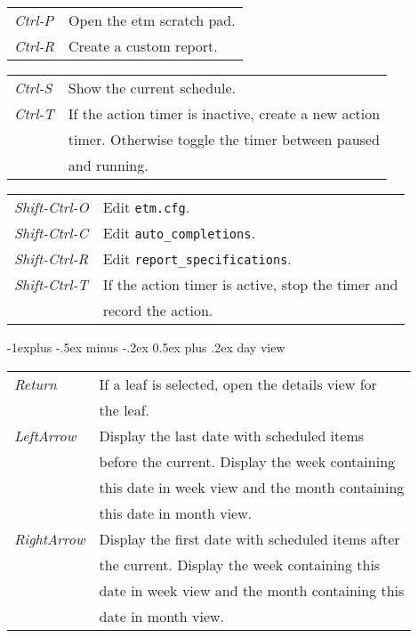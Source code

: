 \documentclass[9pt,landscape]{article}
\makeatletter
\renewcommand{\subsection}{\@startsection{subsection}{2}{0mm}%
                                {-1explus -.5ex minus -.2ex}%
                                {0.5ex plus .2ex}%
                                {\normalfont\normalsize\bfseries}}
\makeatother
\begin{document}
\begin{multicols}{3}
\begin{tabular}{@{}ll@{}}
\emph{Ctrl-P}        & Open the etm scratch pad. \\
\emph{Ctrl-R}        & Create a custom report. \\
\end{tabular}
\begin{tabular}{@{}ll@{}}
\emph{Ctrl-S}        & Show the current schedule. \\
\emph{Ctrl-T}        & If the action timer is inactive, create a new action \\
                        & timer. Otherwise toggle the timer between paused \\
                        & and running. \\
\end{tabular}
\begin{tabular}{@{}ll@{}}
\emph{Shift-Ctrl-O}  & Edit \verb'etm.cfg'. \\
\emph{Shift-Ctrl-C}  & Edit \verb'auto_completions'. \\
\emph{Shift-Ctrl-R}  & Edit \verb'report_specifications'. \\
\emph{Shift-Ctrl-T}  & If the action timer is active, stop the timer and \\
                        & record the action. \\
\end{tabular}

\subsection{day view}

\begin{tabular}{@{}ll@{}}
\emph{Return}     & If a leaf is selected, open the details view for \\
                  & the leaf. \\
\emph{LeftArrow}  & Display the last date with scheduled items \\
                  & before the current. Display the week containing \\
                  & this date in week view and the month containing \\
                  & this date in month view. \\
\emph{RightArrow} & Display the first date with scheduled items after \\
                  & the current. Display the week containing this \\
                  & date in week view and the month containing this \\
                  & date in month view. \\
\end{tabular}



\end{multicols}
\end{document}
